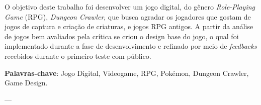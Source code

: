 \documentclass[
	12pt,				%
	openright,			%
	twoside,			%
	a4paper,			%
	english,			%
	french,				%
	spanish,			%
	brazil				%
	]{abntex2}
\newcommand{\listofquadrosname}{Lista de quadros}
\begin{document}


\setlength{\absparsep}{18pt} %
\begin{resumo}
 O objetivo deste trabalho foi desenvolver um jogo digital, do gênero \emph{Role-Playing Game} (RPG), \emph{Dungeon Crawler}, que busca agradar os jogadores que gostam de jogos de captura e criação de criaturas, e jogos RPG antigos. A partir da análise de jogos bem avaliados pela crítica se criou o design base do jogo, o qual foi implementado durante a fase de desenvolvimento e refinado por meio de \emph{feedbacks} recebidos durante o primeiro teste com público.


 \textbf{Palavras-chave}: Jogo Digital, Videogame, RPG, Pokémon, Dungeon Crawler, Game Design.
\end{resumo}


 


\listoffigures*
\cleardoublepage
 ---

\end{document}
